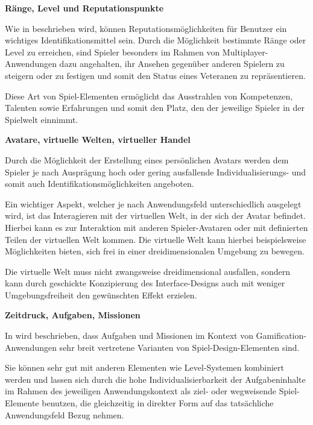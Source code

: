 \documentclass[bibliography=totoc,listof=totoc,BCOR=5mm,DIV=12,oneside]{scrbook}
\begin{document}
\par \bigskip \textbf{Ränge, Level und Reputationspunkte}
\par Wie in \citep[Kapitel 4.5 Reputations, Ranks and Levels, Seite 75]{reeves2009total} beschrieben wird, können Reputationsmöglichkeiten für Benutzer ein wichtiges Identifikationsmittel sein. Durch die Möglichkeit bestimmte Ränge oder Level zu erreichen, sind Spieler besonders im Rahmen von Multiplayer-Anwendungen dazu angehalten, ihr Ansehen gegenüber anderen Spielern zu steigern oder zu festigen und somit den Status eines Veteranen zu repräsentieren.
\par Diese Art von Spiel-Elementen ermöglicht das Ausstrahlen von Kompetenzen, Talenten sowie Erfahrungen und somit den Platz, den der jeweilige Spieler in der Spielwelt einnimmt.

\par \bigskip \textbf{Avatare, virtuelle Welten, virtueller Handel}
\par Durch die Möglichkeit der Erstellung eines persönlichen Avatars werden dem Spieler je nach Ausprägung hoch oder gering ausfallende Individualisierungs- und somit auch Identifikationsmöglichkeiten angeboten. 
\par Ein wichtiger Aspekt, welcher je nach Anwendungsfeld unterschiedlich ausgelegt wird, ist das Interagieren mit der virtuellen Welt, in der sich der Avatar befindet. Hierbei kann es zur Interaktion mit anderen Spieler-Avataren oder mit definierten Teilen der virtuellen Welt kommen. Die virtuelle Welt kann hierbei beispielsweise Möglichkeiten bieten, sich frei in einer dreidimensionalen Umgebung zu bewegen. 
\par Die virtuelle Welt muss nicht zwangsweise dreidimensional ausfallen, sondern kann durch geschickte Konzipierung des Interface-Designs auch mit weniger Umgebungsfreiheit den gewünschten Effekt erzielen.

\par \bigskip \textbf{Zeitdruck, Aufgaben, Missionen}
\par In \citep[Kapitel 6.1.1 Tasks]{pflanzl2018gamification} wird beschrieben, dass Aufgaben und Missionen im Kontext von Gamification-Anwendungen sehr breit vertretene Varianten von Spiel-Design-Elementen sind. 
\par Sie können sehr gut mit anderen Elementen wie Level-Systemen kombiniert werden und lassen sich durch die hohe Individualisierbarkeit der Aufgabeninhalte im Rahmen des jeweiligen Anwendungskontext als ziel- oder wegweisende Spiel-Elemente benutzen, die gleichzeitig in direkter Form auf das tatsächliche Anwendungsfeld Bezug nehmen.
\end{document}
